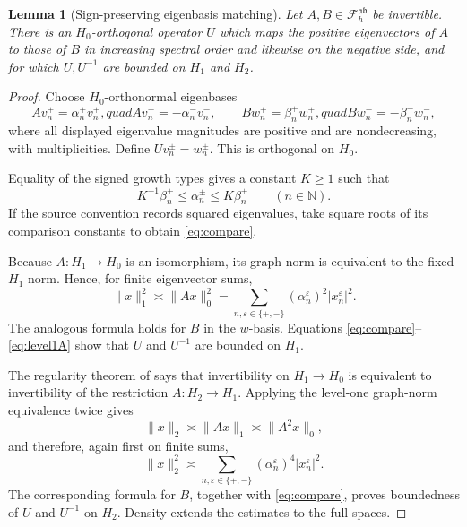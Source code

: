 \documentclass[11pt]{article}
\newtheorem{lemma}[theorem]{Lemma}
\newcommand{\N}{\mathbb N}
\newcommand{\F}{\mathcal F}
\begin{document}
\begin{lemma}[Sign-preserving eigenbasis matching]\label{lem:matching}
Let $A,B\in\F_h^{\mathfrak a\mathfrak b}$ be invertible.  There is an
$H_0$-orthogonal operator $U$ which maps the positive eigenvectors of $A$ to
those of $B$ in increasing spectral order and likewise on the negative side,
and for which $U,U^{-1}$ are bounded on $H_1$ and $H_2$.
\end{lemma}

\begin{proof}
Choose $H_0$-orthonormal eigenbases
\[
 Av_n^+=\alpha_n^+v_n^+,quad Av_n^-=-\alpha_n^-v_n^-,
 \qquad
 Bw_n^+=\beta_n^+w_n^+,quad Bw_n^-=-\beta_n^-w_n^-,
\]
where all displayed eigenvalue magnitudes are positive and are nondecreasing,
with multiplicities.  Define $Uv_n^\pm=w_n^\pm$.  This is orthogonal on
$H_0$.

Equality of the signed growth types gives a constant $K\ge1$ such that
\begin{equation}\label{eq:compare}
 K^{-1}\beta_n^\pm\le\alpha_n^\pm\le K\beta_n^\pm
 \qquad(n\in\N).
\end{equation}
If the source convention records squared eigenvalues, take square roots of
its comparison constants to obtain \eqref{eq:compare}.

Because $A:H_1\to H_0$ is an isomorphism, its graph norm is equivalent to
the fixed $H_1$ norm.  Hence, for finite eigenvector sums,
\begin{equation}\label{eq:level1A}
 \|x\|_1^2\asymp\|Ax\|_0^2
 =\sum_{n,\varepsilon\in\{+,-\}}
 (\alpha_n^\varepsilon)^2|x_n^\varepsilon|^2.
\end{equation}
The analogous formula holds for $B$ in the $w$-basis.  Equations
\eqref{eq:compare}--\eqref{eq:level1A} show that $U$ and $U^{-1}$ are
bounded on $H_1$.

The regularity theorem of \cite{FW} says that invertibility on
$H_1\to H_0$ is equivalent to invertibility of the restriction
$A:H_2\to H_1$.  Applying the level-one graph-norm equivalence twice gives
\begin{equation}\label{eq:level2A}
 \|x\|_2\asymp\|Ax\|_1\asymp\|A^2x\|_0,
\end{equation}
and therefore, again first on finite sums,
\[
 \|x\|_2^2\asymp
 \sum_{n,\varepsilon\in\{+,-\}}
 (\alpha_n^\varepsilon)^4|x_n^\varepsilon|^2.
\]
The corresponding formula for $B$, together with \eqref{eq:compare}, proves
boundedness of $U$ and $U^{-1}$ on $H_2$.  Density extends the estimates to
the full spaces.
\end{proof}
\end{document}
